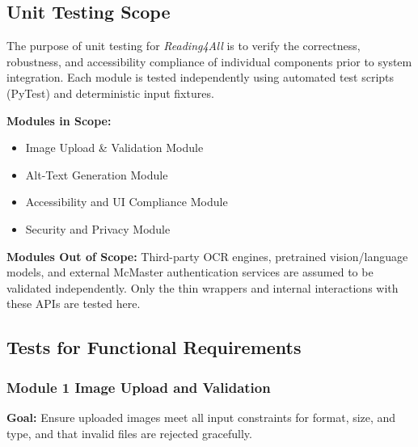 \documentclass[12pt, titlepage]{article}
\begin{document}
\subsection{Unit Testing Scope}

The purpose of unit testing for \textit{Reading4All} is to verify the
correctness, robustness, and accessibility compliance of individual
components prior to system integration. Each module is tested
independently using automated test scripts (PyTest) and deterministic
input fixtures.

\textbf{Modules in Scope:}
\begin{itemize}
\item Image Upload \& Validation Module
\item Alt-Text Generation Module
\item Accessibility and UI Compliance Module
\item Security and Privacy Module
\end{itemize}

\textbf{Modules Out of Scope:}
Third-party OCR engines, pretrained vision/language models, and
external McMaster authentication services are assumed to be validated
independently. Only the thin wrappers and internal interactions with
these APIs are tested here.

\subsection{Tests for Functional Requirements}

\subsubsection{Module 1 \textemdash{} Image Upload and Validation}

\textbf{Goal:} Ensure uploaded images meet all input constraints for
format, size, and type, and that invalid files are rejected gracefully.
\end{document}
